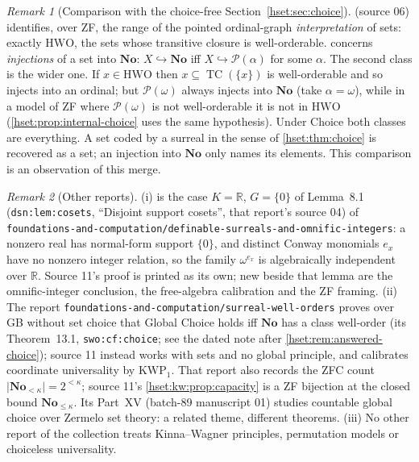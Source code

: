 \documentclass[11pt,letterpaper]{article}
\theoremstyle{definition}
\theoremstyle{remark}
\newtheorem{remark}[remark]{Remark}\aliascntresetthe{remark}
\newcommand{\No}{\mathbf{No}}
\newcommand{\TC}{\operatorname{TC}}
\newcommand{\Pow}{\mathcal P}
\newcommand{\card}[1]{\lvert#1\rvert}
\newcommand{\HWO}{\mathrm{HWO}}
\newcommand{\lbl}[1]{\nolinkurl{#1}}
\newcommand{\repo}[1]{\nolinkurl{#1}}
\newcommand{\KWP}{\mathrm{KWP}}
\newcommand{\R}{\mathbb R}
\begin{document}
\begin{remark}[Comparison with the choice-free Section~\ref{hset:sec:choice}]
\label{hset:kw:rem:choice}
 (source 06) identifies, over ZF, the range of the pointed
ordinal-graph \emph{interpretation} of sets: exactly $\HWO$, the sets whose
transitive closure is well-orderable.  concerns
\emph{injections} of a set into $\No$: $X\hookrightarrow\No$ iff
$X\hookrightarrow\Pow(\alpha)$ for some $\alpha$. The second class is the wider
one. If $x\in\HWO$ then $x\subseteq\TC(\{x\})$ is well-orderable and so injects
into an ordinal; but $\Pow(\omega)$ always injects into $\No$ (take $\alpha=\omega$),
while in a model of ZF where $\Pow(\omega)$ is not well-orderable it is not in
$\HWO$ (\cref{hset:prop:internal-choice} uses the same hypothesis). Under Choice
both classes are everything. A set coded by a surreal in the sense of
\cref{hset:thm:choice} is recovered as a set; an injection into $\No$ only names
its elements. This comparison is an observation of this merge.
\end{remark}

\begin{remark}[Other reports]
\label{hset:kw:rem:other}
(i)  is the case $K=\R$, $G=\{0\}$ of Lemma~8.1
(\lbl{dsn:lem:cosets}, ``Disjoint support cosets'', that report's source 04) of
\repo{foundations-and-computation/definable-surreals-and-omnific-integers}: a
nonzero real has normal-form support $\{0\}$, and distinct Conway monomials
$e_x$ have no nonzero integer relation, so the family $\omega^{e_x}$ is
algebraically independent over $\R$. Source 11's proof is printed as its own;
new beside that lemma are the omnific-integer conclusion, the free-algebra
calibration and the ZF framing. (ii) The report
\repo{foundations-and-computation/surreal-well-orders} proves over GB without
set choice that Global Choice holds iff $\No$ has a class well-order (its
Theorem~13.1, \lbl{swo:cf:choice}; see the dated note after
\cref{hset:rem:answered-choice}); source 11 instead works with sets and no
global principle, and calibrates coordinate universality by $\KWP_1$. That
report also records the ZFC count $\card{\No_{<\kappa}}=2^{<\kappa}$; source
11's \cref{hset:kw:prop:capacity} is a ZF bijection at the closed bound
$\No_{\le\kappa}$. Its Part~XV (batch-89 manuscript 01) studies countable global
choice over Zermelo set theory: a related theme, different theorems.
(iii) No other report of the collection treats Kinna--Wagner principles,
permutation models or choiceless universality.
\end{remark}
\end{document}
